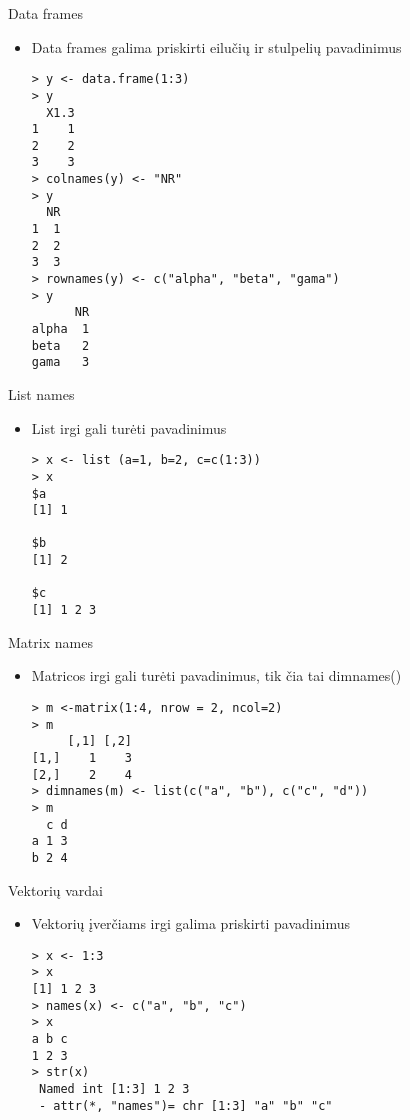 \documentclass[11pt,xcolor=table]{beamer}
\begin{document}
\begin{frame}[fragile]{Data frames}
\begin{itemize}
\item Data frames galima priskirti eilučių ir stulpelių pavadinimus
\begin{lstlisting}
> y <- data.frame(1:3)
> y
  X1.3
1    1
2    2
3    3
> colnames(y) <- "NR"
> y
  NR
1  1
2  2
3  3
> rownames(y) <- c("alpha", "beta", "gama")
> y
      NR
alpha  1
beta   2
gama   3
\end{lstlisting}
\end{itemize}
\end{frame}


\begin{frame}[fragile]{List names}
\begin{itemize}
\item List irgi gali turėti pavadinimus
\begin{lstlisting}
> x <- list (a=1, b=2, c=c(1:3))
> x
$a
[1] 1

$b
[1] 2

$c
[1] 1 2 3
\end{lstlisting}
\end{itemize}
\end{frame}


\begin{frame}[fragile]{Matrix names}
\begin{itemize}
\item Matricos irgi gali turėti pavadinimus, tik čia tai dimnames()
\begin{lstlisting}
> m <-matrix(1:4, nrow = 2, ncol=2)
> m
     [,1] [,2]
[1,]    1    3
[2,]    2    4
> dimnames(m) <- list(c("a", "b"), c("c", "d"))
> m
  c d
a 1 3
b 2 4
\end{lstlisting}
\end{itemize}
\end{frame}


\begin{frame}[fragile]{Vektorių vardai}
\begin{itemize}
\item Vektorių įverčiams irgi galima priskirti pavadinimus
\begin{lstlisting}
> x <- 1:3
> x
[1] 1 2 3
> names(x) <- c("a", "b", "c")
> x
a b c 
1 2 3
> str(x)
 Named int [1:3] 1 2 3
 - attr(*, "names")= chr [1:3] "a" "b" "c"
\end{lstlisting}
\end{itemize}
\end{frame}
\end{document}
